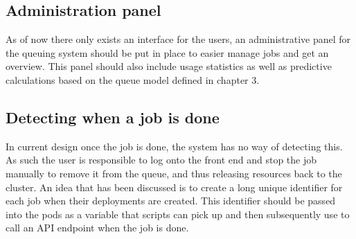 \documentclass[../main.tex]{subfiles}
\begin{document}
\subsection*{Administration panel}
As of now there only exists an interface for the users, an administrative panel for the queuing system should be put in place to easier manage jobs and get an overview. This panel should also include usage statistics as well as predictive calculations based on the queue model defined in chapter 3.

\subsection*{Detecting when a job is done}
In current design once the job is done, the system has no way of detecting this. As such the user is responsible to log onto the front end and stop the job manually to remove it from the queue, and thus releasing resources back to the cluster. An idea that has been discussed is to create a long unique identifier for each job when their deployments are created. This identifier should be passed into the pods as a variable that scripts can pick up and then subsequently use to call an API endpoint when the job is done.



\end{document}
